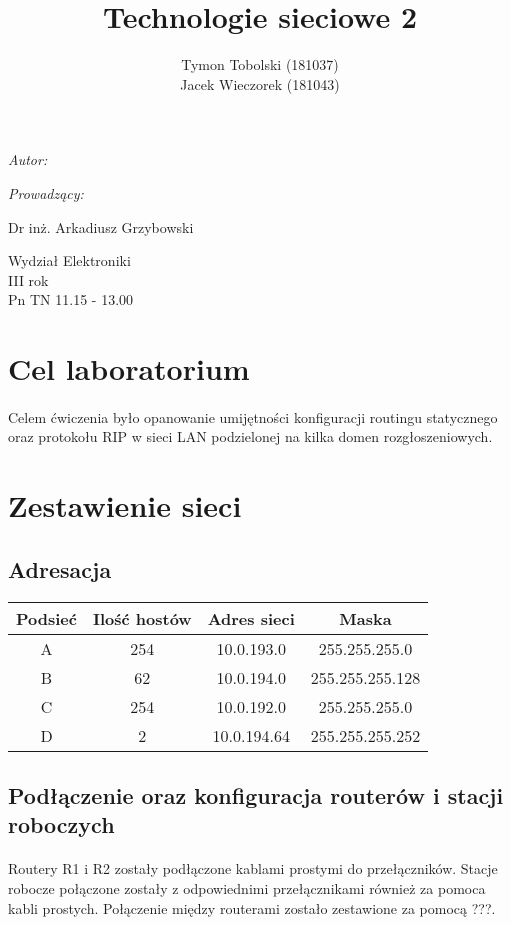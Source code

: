 \documentclass[wide,a4paper,titlepage,12pt] {article}
\title{Technologie sieciowe 2}
\author{Tymon Tobolski (181037)\\ Jacek Wieczorek (181043)}
\makeatletter
\renewcommand{\maketitle}{
\begin{titlepage}
  \begin{center}
    \vspace*{3cm}
    \LARGE \@title \par
    \vspace{2cm}
    \textit{\small Autor:}\par
    \normalsize \@author\par \normalsize
    \vspace{3cm}
    \textit{\small Prowadzący:}\par
    Dr inż. Arkadiusz Grzybowski\par
    \vspace{2cm}
    Wydział Elektroniki\\ III rok\\ Pn TN 11.15 - 13.00\par
    \vspace{4cm}
    \small \@date
  \end{center}
\end{titlepage}
}
\makeatother
\begin{document}
\maketitle
  \section{Cel laboratorium}
  \paragraph{}
  Celem ćwiczenia było opanowanie umijętności konfiguracji routingu statycznego oraz protokołu RIP w sieci LAN podzielonej na kilka domen rozgłoszeniowych.

  \section{Zestawienie sieci}

  \subsection{Adresacja}

  \begin{center}
    \begin{tabular}{|c|c|c|c|}
      \hline
      Podsieć & Ilość hostów & Adres sieci & Maska \\
      \hline
      A & 254 & 10.0.193.0  & 255.255.255.0 \\
      B & 62  & 10.0.194.0  & 255.255.255.128 \\
      C & 254 & 10.0.192.0  & 255.255.255.0 \\
      D & 2   & 10.0.194.64 & 255.255.255.252 \\
      \hline
    \end{tabular}
  \end{center}

  \subsection{Podłączenie oraz konfiguracja routerów i stacji roboczych}
  \paragraph{}
  Routery R1 i R2 zostały podłączone kablami prostymi do przełączników. Stacje robocze połączone zostały z odpowiednimi przełącznikami również za pomoca kabli prostych. Połączenie między routerami zostało zestawione za pomocą ???.
\end{document}
